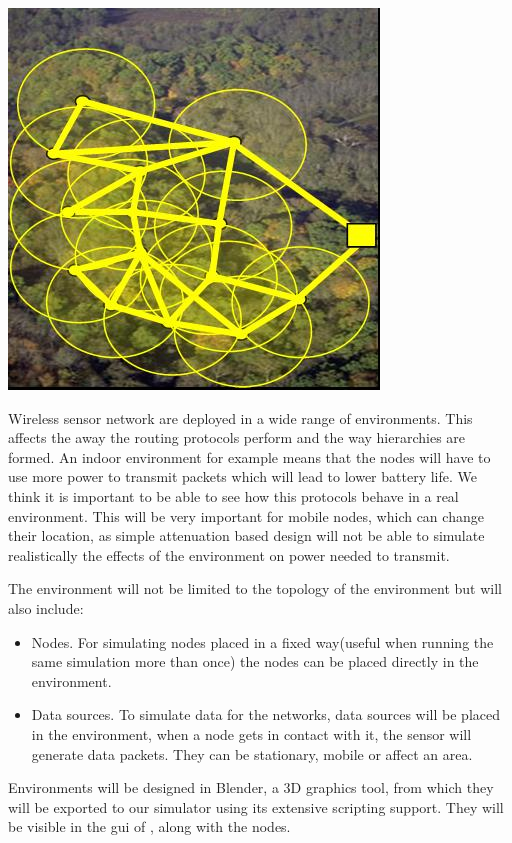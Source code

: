 \begin{center}
	\includegraphics{img/env.jpg}
\end{center}

Wireless sensor network are deployed in a wide range of environments. This affects
the away the routing protocols perform and the way hierarchies are formed. An indoor
environment for example means that the nodes will have to use more power to transmit
packets which will lead to lower battery life. We think it is important to be able to
see how this protocols behave in a real environment. This will be very important for
mobile nodes, which can change their location, as simple attenuation based design will
not be able to simulate realistically the effects of the environment on power needed to
transmit.

The environment will not be limited to the topology of the environment but will also 
include:
\begin{itemize}
	\item Nodes. For simulating nodes placed in a fixed way(useful when running the same
simulation more than once) the nodes can be placed directly in the environment.
	\item Data sources. To simulate data for the networks, data sources will be placed in
the environment, when a node gets in contact with it, the sensor will generate data packets. 
They can be stationary, mobile or affect an area.
\end{itemize}

Environments will be designed in Blender, a 3D graphics tool, from which they will be
exported to our simulator using its extensive scripting support. They will be visible
in the gui of \codename, along with the nodes.


